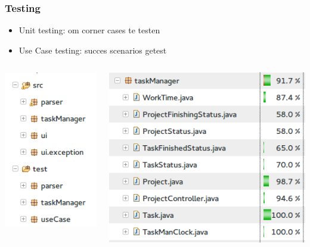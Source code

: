 \documentclass{beamer}
\begin{document}
\begin{frame}
\frametitle {Testing}
\begin{itemize}
	\item Unit testing: om corner cases te testen
	\item Use Case testing: succes scenarios getest
\end{itemize}
\begin{columns}
	\begin{column}{.4\paperwidth}
		\includegraphics[width=0.25\paperwidth]{figures/Package_overview_eclipse.png}
	\end{column}
	\begin{column}{.5\paperwidth}
		\includegraphics[width=0.45\paperwidth]{figures/coverage.png}
	\end{column}
\end{columns}
\end{frame}
\end{document}
